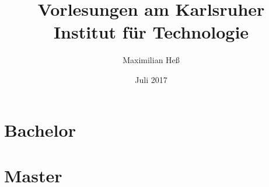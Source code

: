 \documentclass[a4paper,8pt,titlepage]{scrbook}
\title{Vorlesungen am Karlsruher Institut für Technologie}
\author{Maximilian Heß}
\date{Juli 2017}
\begin{document}
\maketitle
\tableofcontents

\part{Bachelor}










\part{Master}













\end{document}
